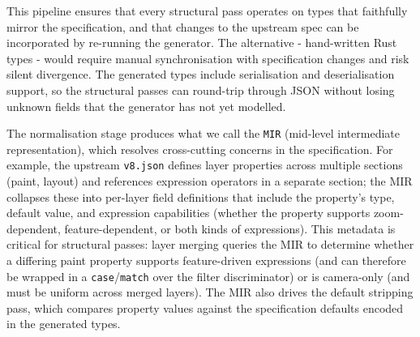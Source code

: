 This pipeline ensures that every structural pass operates on types that faithfully mirror the specification, and that changes to the upstream spec can be incorporated by re-running the generator.
The alternative - hand-written Rust types - would require manual synchronisation with specification changes and risk silent divergence.
The generated types include serialisation and deserialisation support, so the structural passes can round-trip through JSON without losing unknown fields that the generator has not yet modelled.

The normalisation stage produces what we call the \texttt{MIR} (mid-level intermediate representation), which resolves cross-cutting concerns in the specification.
For example, the upstream \texttt{v8.json} defines layer properties across multiple sections (paint, layout) and references expression operators in a separate section; the MIR collapses these into per-layer field definitions that include the property's type, default value, and expression capabilities (whether the property supports zoom-dependent, feature-dependent, or both kinds of expressions).
This metadata is critical for structural passes: layer merging queries the MIR to determine whether a differing paint property supports feature-driven expressions (and can therefore be wrapped in a \texttt{case}/\texttt{match} over the filter discriminator) or is camera-only (and must be uniform across merged layers).
The MIR also drives the default stripping pass, which compares property values against the specification defaults encoded in the generated types.


